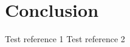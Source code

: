\documentclass[conference]{IEEEtran}
\begin{document}

\section{Conclusion}


\pagebreak
\begin{thebibliography}{00}
     Test reference 1
     Test reference 2
\end{thebibliography}
\end{document}
